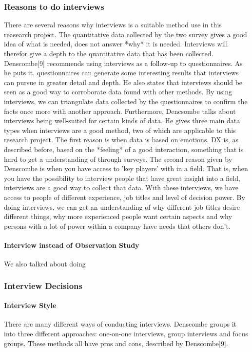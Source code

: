 \documentclass{article}
\begin{document}
\subsubsection{Reasons to do interviews}
There are several reasons why interviews is a suitable method use in this reasearch project.
The quantitative data collected
by the two survey gives a good idea of what is needed, does not answer *why* it is needed.
Interviews will therefor give a depth to the quantitative data that has been collected.
Denscombe[9] recommends using interviews as a follow-up to questionnaires. As he puts it,
questionnaires can generate some interesting results that interviews can pursue
in greater detail and depth. He also states that interviews should be seen as a good way
to corroborate data found with other methods. By using interviews, we can triangulate data
collected by the questionnaires to confirm the facts once more with another approach.
Furthermore, Dencsombe talks about interviews being well-suited for certain kinds of data.
He gives three main data types when interviews are a good method,
two of which are applicable to this research project. The first reason is
when data is based on emotions. DX is, as described before, based on the *feeling*
of a good interaction, something that is hard to get a understanding of through
surveys. The second reason given by Denscombe is when you have access to 'key players'
with in a field. That is, when you have the possibility to interview people
that have great insight into a field, interviews are a good way to collect that data.
With these interviews, we have access to people of different experience, job titles
and level of decision power. By doing interviews, we can get an understanding
of why different job titles desire different things, why more experienced people
want certain aspects and why persons with a lot of power within a company
have needs that others don't.

\paragraph{Interview instead of Observation Study}
We also talked about doing

\subsubsection{Interview Decisions}
\paragraph{Interview Style}
There are many different ways of conducting interviews. Denscombe groups it into
three different approaches: one-on-one interviews, group interviews and focus groups.
These methods all have pros and cons, described by Denscombe[9].
\end{document}
